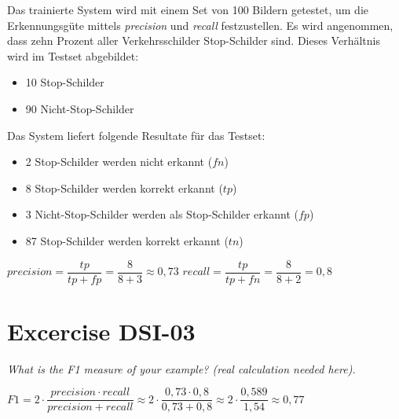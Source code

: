 \documentclass[11pt,a4paper]{article}
\begin{document}
Das trainierte System wird mit einem Set von 100 Bildern getestet, um die Erkennungsgüte mittels \emph{precision} und \emph{recall} festzustellen. Es wird angenommen, dass zehn Prozent aller Verkehrsschilder Stop-Schilder sind. Dieses Verhältnis wird im Testset abgebildet:
\begin{itemize}
	\item 10 Stop-Schilder
	\item 90 Nicht-Stop-Schilder
\end{itemize}

Das System liefert folgende Resultate für das Testset:

\begin{itemize}
	\item 2 Stop-Schilder werden nicht erkannt ($fn$)
	\item 8 Stop-Schilder werden korrekt erkannt ($tp$)
	\item 3 Nicht-Stop-Schilder werden als Stop-Schilder erkannt ($fp$)
	\item 87 Stop-Schilder werden korrekt erkannt ($tn$)
\end{itemize}

$precision = \dfrac{tp}{tp + fp} = \dfrac{8}{8 + 3} \approx 0,73$
$recall = \dfrac{tp}{tp + fn} = \dfrac{8}{8 + 2} = 0,8 $


\section{Excercise DSI-03}
\textit{What is the F1 measure of your example? (real calculation needed here).}

$ F1 = 2 \cdot \dfrac{precision \cdot recall}{precision + recall} 
     \approx 2 \cdot \dfrac{0,73 \cdot 0,8}{0,73 + 0,8} \approx 2 \cdot \dfrac{0,589}{1,54}
     \approx 0,77$
\end{document}
